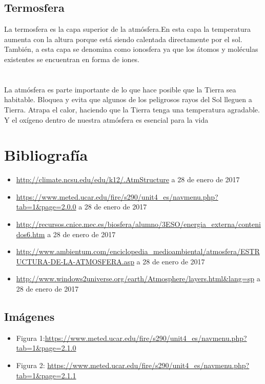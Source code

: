 \documentclass{article}
\begin{document}
\subsection*{Termosfera}
La termosfera es la capa superior de la atmósfera.En esta capa la temperatura aumenta con la altura porque está siendo calentada directamente por el sol.
También, a esta capa se denomina como ionosfera ya que los átomos y moléculas existentes se encuentran en forma de iones.
\\ \\ \\La atmósfera es parte importante de lo que hace posible que la Tierra sea habitable. Bloquea y evita que algunos de los peligrosos rayos del Sol lleguen a Tierra. Atrapa el calor, haciendo que la Tierra tenga una temperatura agradable. Y el oxígeno dentro de nuestra atmósfera es esencial para la vida
\newpage
\section*{Bibliografía}

\begin{itemize}
\item \url{http://climate.ncsu.edu/edu/k12/.AtmStructure}  a 28 de enero de 2017
\item \url{https://www.meted.ucar.edu/fire/s290/unit4_es/navmenu.php?tab=1&page=2.0.0}  a 28 de enero de 2017 
\item \url{http://recursos.cnice.mec.es/biosfera/alumno/3ESO/energia_externa/contenidos6.htm}  a 28 de enero de 2017

\item \url{http://www.ambientum.com/enciclopedia_medioambiental/atmosfera/ESTRUCTURA-DE-LA-ATMOSFERA.asp}  a 28 de enero de 2017
\item \url{http://www.windows2universe.org/earth/Atmosphere/layers.html&lang=sp}    a 28 de enero de 2017
\end{itemize}
\subsection*{Imágenes}
\begin{itemize}
\item Figura 1:\url{https://www.meted.ucar.edu/fire/s290/unit4_es/navmenu.php?tab=1&page=2.1.0}
\item Figura 2: \url{https://www.meted.ucar.edu/fire/s290/unit4_es/navmenu.php?tab=1&page=2.1.1}
\end{itemize}
\end{document}
